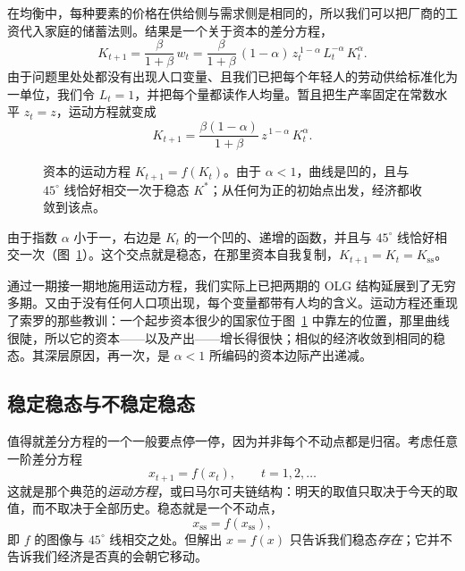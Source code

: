 在均衡中，每种要素的价格在供给侧与需求侧是相同的，所以我们可以把厂商的工资代入家庭的储蓄法则。结果是一个关于资本的差分方程，
\[
K_{t+1} = \frac{\beta}{1+\beta}\, w_t = \frac{\beta}{1+\beta}\,(1-\alpha)\,z_t^{\,1-\alpha}\, L_t^{-\alpha}\, K_t^{\alpha}.
\]
由于问题里处处都没有出现人口变量、且我们已把每个年轻人的劳动供给标准化为一单位，我们令 $L_t = 1$，并把每个量都读作人均量。暂且把生产率固定在常数水平 $z_t = z$，运动方程就变成
\[
K_{t+1} = \frac{\beta(1-\alpha)}{1+\beta}\, z^{\,1-\alpha}\, K_t^{\alpha}.
\]

\begin{figure}[h]
\centering

\caption{资本的运动方程 $K_{t+1}=f(K_t)$。由于 $\alpha<1$，曲线是凹的，且与 $45^\circ$ 线恰好相交一次于稳态 $K^{*}$；从任何为正的初始点出发，经济都收敛到该点。}
\label{fig:macro-6}
\end{figure}

由于指数 $\alpha$ 小于一，右边是 $K_t$ 的一个凹的、递增的函数，并且与 $45^\circ$ 线恰好相交一次（图~\ref{fig:macro-6}）。这个交点就是稳态，在那里资本自我复制，$K_{t+1} = K_t = K_{\mathrm{ss}}$。


通过一期接一期地施用运动方程，我们实际上已把两期的 OLG 结构延展到了无穷多期。又由于没有任何人口项出现，每个变量都带有人均的含义。运动方程还重现了索罗的那些教训：一个起步资本很少的国家位于图~\ref{fig:macro-6} 中靠左的位置，那里曲线很陡，所以它的资本——以及产出——增长得很快；相似的经济收敛到相同的稳态。其深层原因，再一次，是 $\alpha < 1$ 所编码的资本边际产出递减。

\subsection{稳定稳态与不稳定稳态}

值得就差分方程的一个一般要点停一停，因为并非每个不动点都是归宿。考虑任意一阶差分方程
\[
x_{t+1} = f(x_t), \qquad t = 1, 2, \dots
\]
这就是那个典范的\emph{运动方程}，或曰马尔可夫链结构：明天的取值只取决于今天的取值，而不取决于全部历史。稳态就是一个不动点，
\[
x_{\mathrm{ss}} = f(x_{\mathrm{ss}}),
\]
即 $f$ 的图像与 $45^\circ$ 线相交之处。但解出 $x = f(x)$ 只告诉我们稳态\emph{存在}；它并不告诉我们经济是否真的会朝它移动。

